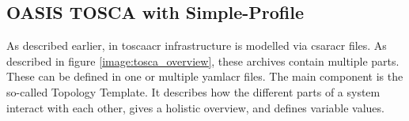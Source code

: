 
\subsection{OASIS TOSCA with Simple-Profile}
As described earlier, in \gls{toscaacr} infrastructure is modelled via \gls{csaracr} files. As described in figure \ref{image:tosca_overview}, these archives contain multiple parts. These can be defined in one or multiple \gls{yamlacr} files. The main component is the so-called Topology Template. It describes how the different parts of a system interact with each other, gives a holistic overview, and defines variable values.

